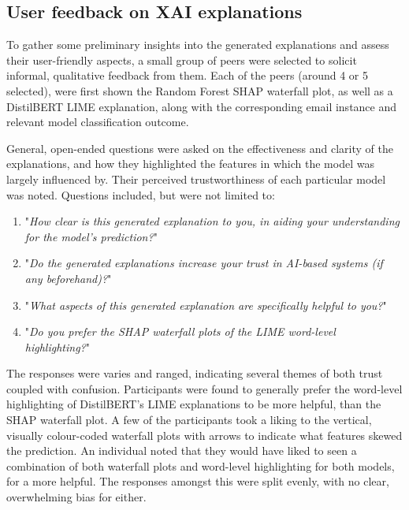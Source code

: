 
\subsection{User feedback on XAI explanations}
To gather some preliminary insights into the generated explanations and assess their user-friendly aspects, a small group of peers were selected to solicit informal, qualitative feedback from them. Each of the peers (around 4 or 5 selected), were first shown the Random Forest SHAP waterfall plot, as well as a DistilBERT LIME explanation, along with the corresponding email instance and relevant model classification outcome.\newline

\noindent General, open-ended questions were asked on the effectiveness and clarity of the explanations, and how they highlighted the features in which the model was largely influenced by. Their perceived trustworthiness of each particular model was noted. Questions included, but were not limited to:

\begin{enumerate}
  \item "\textit{How clear is this generated explanation to you, in aiding your understanding for the model's prediction?}"
  \item "\textit{Do the generated explanations increase your trust in AI-based systems (if any beforehand)?}"
  \item "\textit{What aspects of this generated explanation are specifically helpful to you?}"
  \item "\textit{Do you prefer the SHAP waterfall plots of the LIME word-level highlighting?}"
\end{enumerate}

\noindent The responses were varies and ranged, indicating several themes of both trust coupled with confusion. Participants were found to generally prefer the word-level highlighting of DistilBERT's LIME explanations to be more helpful, than the SHAP waterfall plot. A few of the participants took a liking to the vertical, visually colour-coded waterfall plots with arrows to indicate what features skewed the prediction. An individual noted that they would have liked to seen a combination of both waterfall plots and word-level highlighting for both models, for a more helpful. The responses amongst this were split evenly, with no clear, overwhelming bias for either.\newline

